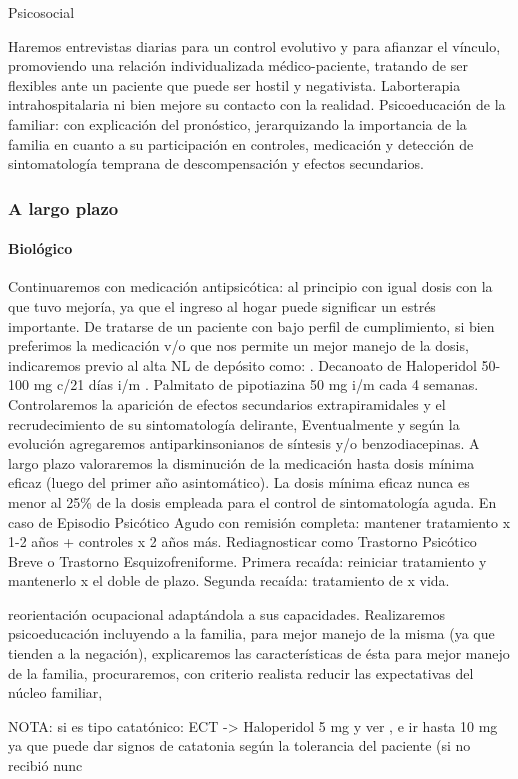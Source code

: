 Psicosocial

Haremos entrevistas diarias para un control evolutivo y para afianzar el vínculo, promoviendo una relación individualizada médico-paciente, tratando de ser flexibles ante un paciente que puede ser hostil y negativista. Laborterapia intrahospitalaria ni bien mejore su contacto con la realidad. Psicoeducación de la familiar: con explicación del pronóstico, jerarquizando la importancia de la familia en cuanto a su participación en controles, medicación y detección de sintomatología temprana de descompensación y efectos secundarios.

\subsubsection*{A largo plazo}
\paragraph{Biológico}
Continuaremos con medicación antipsicótica\cite{ostuzzi2022preventing}: al principio con igual dosis con la que tuvo mejoría, ya que el ingreso al hogar puede significar un estrés importante. De tratarse de un paciente con bajo perfil de cumplimiento, si bien preferimos la medicación v/o que nos permite un mejor manejo de la dosis, indicaremos previo al alta NL de depósito como: . Decanoato de Haloperidol 50-100 mg c/21 días i/m . Palmitato de pipotiazina 50 mg i/m cada 4 semanas. Controlaremos la aparición de efectos secundarios extrapiramidales y el recrudecimiento de su sintomatología delirante, Eventualmente y según la evolución agregaremos antiparkinsonianos de síntesis y/o benzodiacepinas. A largo plazo valoraremos la disminución de la medicación hasta dosis mínima eficaz (luego del primer año asintomático). La dosis mínima eficaz nunca es menor al 25\% de la dosis empleada para el control de sintomatología aguda. En caso de Episodio Psicótico Agudo con remisión completa: mantener tratamiento x 1-2 años + controles x 2 años más. Rediagnosticar como Trastorno Psicótico Breve o Trastorno Esquizofreniforme. Primera recaída: reiniciar tratamiento y mantenerlo x el doble de plazo. Segunda recaída: tratamiento de x vida.

reorientación ocupacional adaptándola a sus capacidades. Realizaremos psicoeducación incluyendo a la familia, para mejor manejo de la misma (ya que tienden a la negación), explicaremos las características de ésta para mejor manejo de la familia, procuraremos, con criterio realista reducir las expectativas del núcleo familiar,

NOTA: si es tipo catatónico: ECT -> Haloperidol 5 mg y ver , e ir hasta 10 mg ya que puede dar signos de catatonia según la tolerancia del paciente (si no recibió nunc
\printbibliography
